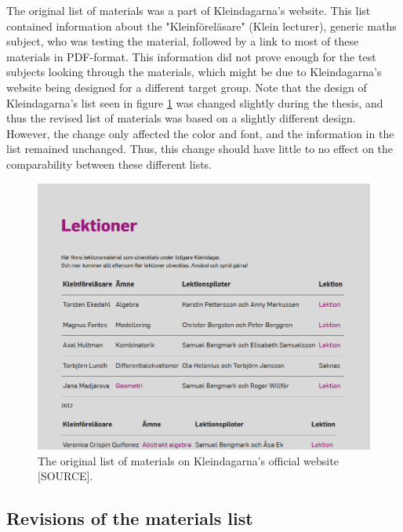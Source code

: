 The original list of materials was a part of Kleindagarna's website. This list contained information about the "Kleinföreläsare" (Klein lecturer), generic maths subject, who was testing the material, followed by a link to most of these materials in PDF-format. This information did not prove enough for the test subjects looking through the materials, which might be due to Kleindagarna's website being designed for a different target group. Note that the design of Kleindagarna's list seen in figure \ref{fig:originmaterialslist} was changed slightly during the thesis, and thus the revised list of materials was based on a slightly different design. However, the change only affected the color and font, and the information in the list remained unchanged. Thus, this change should have little to no effect on the comparability between these different lists.

\begin{figure}[H]
\centering
\includegraphics[width=\linewidth]{figure/screenshot_materiallista_kleindagarna.png}
\caption{The original list of materials on Kleindagarna's official website [SOURCE].}
\label{fig:originmaterialslist}
\end{figure}

\subsection{Revisions of the materials list}


